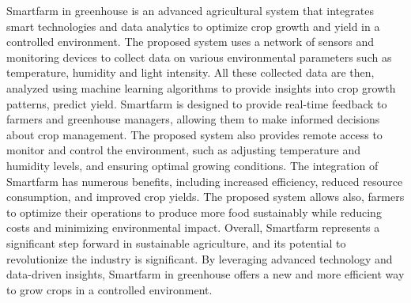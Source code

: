 \begin{abstractEn}
	
	Smartfarm in greenhouse is an advanced agricultural system that integrates
	smart technologies and data analytics to optimize crop growth and yield in a
	controlled environment. The proposed system uses a network of sensors and
	monitoring devices to collect data on various environmental parameters such
	as temperature, humidity and light intensity. All these collected data are then, analyzed using
	machine learning algorithms to provide insights into crop growth patterns,
	predict yield.
	Smartfarm is designed to provide real-time feedback to farmers and
	greenhouse managers, allowing them to make informed decisions about crop
	management. The proposed system also provides remote access to monitor
	and control the environment, such as adjusting temperature and humidity
	levels, and ensuring optimal growing conditions.
	The integration of Smartfarm has numerous benefits, including increased
	efficiency, reduced resource consumption, and improved crop yields. The
	proposed system allows also, farmers to optimize their operations to produce more
	food sustainably while reducing costs and minimizing environmental impact.
	Overall, Smartfarm represents a significant step forward in sustainable
	agriculture, and its potential to revolutionize the industry is significant. By
	leveraging advanced technology and data-driven insights, Smartfarm in
	greenhouse offers a new and more efficient way to grow crops in a controlled
	environment.
	
\end{abstractEn}

